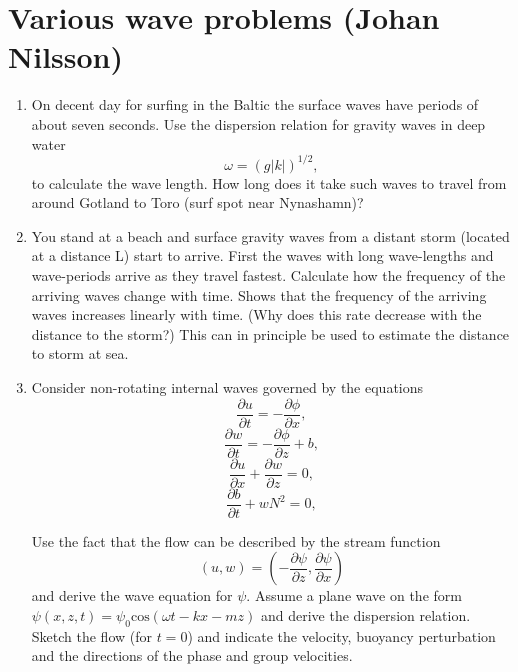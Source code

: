 \documentclass[a4paper,11pt]{article}
\begin{document}
\section{Various wave problems (Johan Nilsson)} 
\begin{enumerate}

\item On decent day for surfing in the Baltic the surface waves have periods of about seven seconds. Use the dispersion relation for gravity waves in deep water
\begin{equation}
\omega = (g |k|)^{1/2},
\end{equation}
to calculate the wave length. How long does it take such waves to travel from around Gotland to Toro (surf spot near Nynashamn)?

\item You stand at a beach and surface gravity waves from a distant storm (located at a distance L) start to arrive. First the waves with long wave-lengths and wave-periods arrive as they travel fastest. Calculate how the frequency of the arriving waves change with time. Shows that the frequency of the arriving waves increases linearly with time. (Why does this rate decrease with the distance to the storm?) This can in principle be used to estimate the distance to storm at sea.

\item Consider non-rotating internal waves governed by the equations
\begin{equation}
\frac{\partial u}{\partial t} = -\frac{\partial \phi}{\partial x},
\end{equation}
\begin{equation}
\frac{\partial w}{\partial t} = -\frac{\partial \phi}{\partial z} + b,
\end{equation}
\begin{equation}
\frac{\partial u}{\partial x} + \frac{\partial w}{\partial z} = 0,
\end{equation}
\begin{equation}
\frac{\partial b}{\partial t} + wN^{2} = 0,
\end{equation}

Use the fact that the flow can be described by the stream function
\begin{equation}
(u,w) = \left(-\frac{\partial \psi}{\partial z}, \frac{\partial \psi}{\partial x} \right) 
\end{equation}
and derive the wave equation for $\psi$. Assume a plane wave on the form $\psi(x, z, t) = \psi_{0} \text{cos}(\omega t - kx - mz)$ and derive the dispersion relation. Sketch the flow (for $t = 0$) and indicate the velocity, buoyancy perturbation and the directions of the phase and group velocities.


\end{enumerate}
\end{document}
